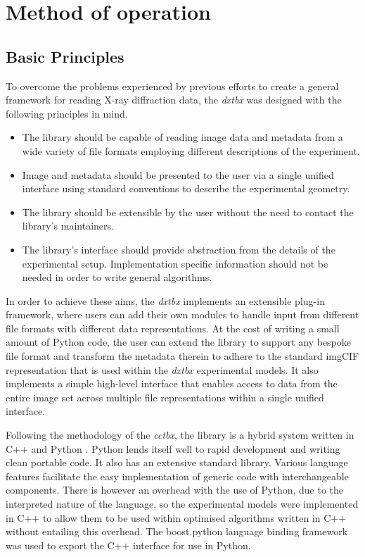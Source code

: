 \documentclass[preprint]{iucr}
\newcommand{\cctbx}{\emph{cctbx}\xspace}
\newcommand{\dxtbx}{\emph{dxtbx}\xspace}
\begin{document}
\section{Method of operation}

\subsection{Basic Principles}

To overcome the problems experienced by previous efforts to create a general 
framework for reading X-ray diffraction data, the \dxtbx was designed with the 
following principles in mind.

\begin{itemize}
  \item The library should be capable of reading image data and metadata from 
  a wide variety of file formats employing different descriptions of the 
  experiment.
  \item Image and metadata should be presented to the user via a single unified 
  interface using standard conventions to describe the experimental geometry.
  \item The library should be extensible by the user without the need to contact 
  the library's maintainers.
  \item The library's interface should provide abstraction from the details of 
  the experimental setup. Implementation specific information should not be 
  needed in order to write general algorithms.
\end{itemize}

In order to achieve these aims, the \dxtbx implements an extensible plug-in 
framework, where users can add their own modules to handle input from different 
file formats with different data representations. At the cost of writing a small 
amount of Python code, the user can extend the library to support any bespoke 
file format and transform the metadata therein to adhere to the standard imgCIF 
representation that is used within the \dxtbx experimental models. It also 
implements a simple high-level interface that enables access to data from the 
entire image set across multiple file representations within a single unified 
interface.

Following the methodology of the \cctbx, the library is a hybrid system written 
in C++ and Python \cite{Grosse-Kunstleve2002} \cite{Abrahams2003}. 
Python lends itself well to rapid development and writing clean portable code. 
It also has an extensive standard library. Various language features facilitate 
the easy implementation of generic code with interchangeable components. There 
is however an overhead with the use of Python, due to the interpreted nature of 
the language, so the experimental models were implemented in C++ to allow them 
to be used within optimised algorithms written in C++ without entailing this 
overhead. The boost.python language binding framework was used to export the 
C++ interface for use in Python.
\end{document}
